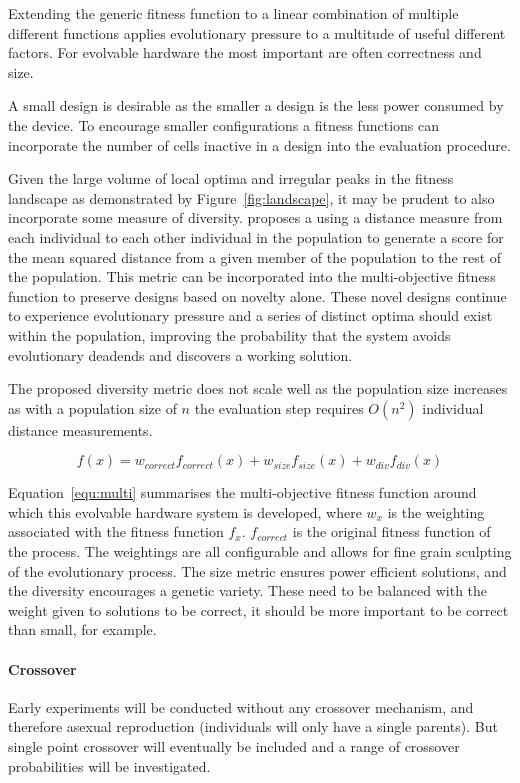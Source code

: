 Extending the generic fitness function to a linear combination of multiple different
functions applies evolutionary pressure to a multitude of useful different factors.
For evolvable hardware the most important are often correctness and size.

A small design is desirable as the smaller a design is the less power consumed
by the device. To encourage smaller configurations a fitness functions can
incorporate the number of cells inactive in a design into the evaluation
procedure.

Given the large volume of local optima and irregular peaks in the fitness
landscape as demonstrated by Figure~\ref{fig:landscape}, it may be prudent to
also incorporate some measure of diversity. \cite{deJong:2001:RBP:2955239.2955241}
proposes a using a
distance measure from each individual to each other individual in the population
to generate a score for the mean squared distance from a given member of the
population to the rest of the population. This metric can be incorporated into
the multi-objective fitness function to preserve designs based on novelty alone.
These novel designs continue to experience evolutionary pressure and a series
of distinct optima should exist within the population, improving the probability
that the system avoids evolutionary deadends and discovers a working solution.

The proposed diversity metric does not scale well as the population size increases
as with a population size of $n$ the evaluation step requires $O(n^2)$ individual
distance measurements.

\begin{equation}
	\label{equ:multi}
	f(x) = w_{correct} f_{correct}(x) + w_{size} f_{size}(x) +
	w_{div} f_{div}(x)
\end{equation}

Equation~\ref{equ:multi} summarises the multi-objective fitness function around
which this evolvable hardware system is developed, where $w_x$ is the weighting
associated with the fitness function $f_x$. $f_{correct}$ is the original fitness
function of the process. The weightings are all
configurable and allows for fine grain sculpting of the evolutionary process.
The size metric ensures power efficient solutions, and the diversity encourages
a genetic variety. These need to be balanced with the weight given to solutions
to be correct, it should be more important to be correct than small, for example.

\paragraph{Crossover}
Early experiments will be conducted without any crossover mechanism, and therefore
asexual reproduction (individuals will only have a single parents). But single
point crossover will eventually be included and a range of crossover probabilities
will be investigated.

